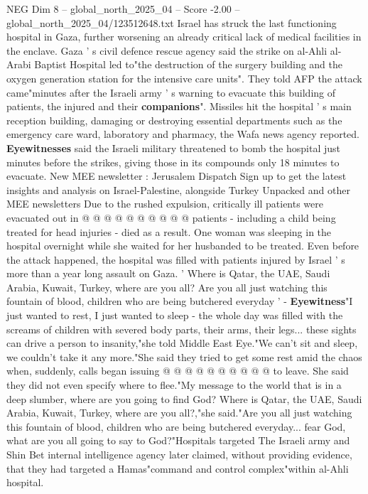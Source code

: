 \begin{textsample}{NEG Dim 8 – global\_north\_2025\_04 – Score -2.00 – global\_north\_2025\_04/123512648.txt}  \label{ex:f8_neg_084}
Israel has struck the last functioning hospital in Gaza, further worsening an already critical lack of medical facilities in the enclave.
Gaza ' s civil defence rescue agency said the strike on al-Ahli al-Arabi Baptist Hospital led to"the destruction of the surgery building and the oxygen generation station for the intensive care units".
They told AFP the attack came"minutes after the Israeli army ' s warning to evacuate this building of patients, the injured and their \textbf{companions}".
Missiles hit the hospital ' s main reception building, damaging or destroying essential departments such as the emergency care ward, laboratory and pharmacy, the Wafa news agency reported. \textbf{Eyewitnesses} said the Israeli military threatened to bomb the hospital just minutes before the strikes, giving those in its compounds only 18 minutes to evacuate.
New MEE newsletter : Jerusalem Dispatch Sign up to get the latest insights and analysis on Israel-Palestine, alongside Turkey Unpacked and other MEE newsletters Due to the rushed expulsion, critically ill patients were evacuated out in @ @ @ @ @ @ @ @ @ @ patients - including a child being treated for head injuries - died as a result.
One woman was sleeping in the hospital overnight while she waited for her husbanded to be treated.
Even before the attack happened, the hospital was filled with patients injured by Israel ' s more than a year long assault on Gaza. ' Where is Qatar, the UAE, Saudi Arabia, Kuwait, Turkey, where are you all?
Are you all just watching this fountain of blood, children who are being butchered everyday ' - \textbf{Eyewitness}"I just wanted to rest, I just wanted to sleep - the whole day was filled with the screams of children with severed body parts, their arms, their legs... these sights can drive a person to insanity,"she told Middle East Eye."We can't sit and sleep, we couldn't take it any more."She said they tried to get some rest amid the chaos when, suddenly, calls began issuing @ @ @ @ @ @ @ @ @ @ to leave.
She said they did not even specify where to flee."My message to the world that is in a deep slumber, where are you going to find God?
Where is Qatar, the UAE, Saudi Arabia, Kuwait, Turkey, where are you all?,"she said."Are you all just watching this fountain of blood, children who are being butchered everyday... fear God, what are you all going to say to God?"Hospitals targeted The Israeli army and Shin Bet internal intelligence agency later claimed, without providing evidence, that they had targeted a Hamas"command and control complex"within al-Ahli hospital.

\end{textsample}
